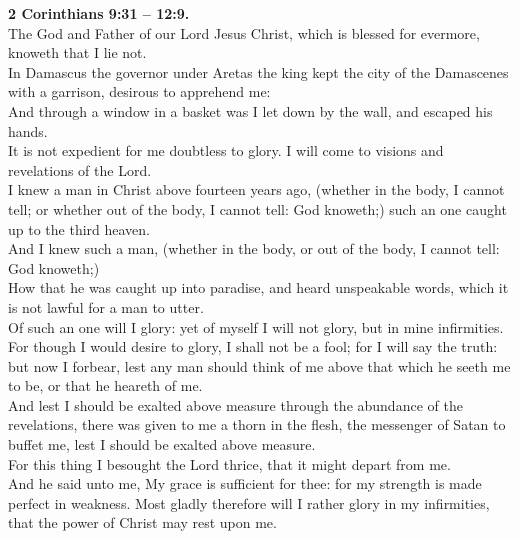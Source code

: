 \documentclass[10pt]{article} %
\begin{document}
{\begin{minipage}[t]{0.45\textwidth}
\textbf{
2 Corinthians 9:31 -- 12:9.
}\\
The God and Father of our Lord Jesus Christ, which is blessed for evermore, knoweth that I lie not.\\
In Damascus the governor under Aretas the king kept the city of the Damascenes with a garrison, desirous to apprehend me:\\
And through a window in a basket was I let down by the wall, and escaped his hands.\\
It is not expedient for me doubtless to glory. I will come to visions and revelations of the Lord.\\
I knew a man in Christ above fourteen years ago, (whether in the body, I cannot tell; or whether out of the body, I cannot tell: God knoweth;) such an one caught up to the third heaven.\\
And I knew such a man, (whether in the body, or out of the body, I cannot tell: God knoweth;)\\
How that he was caught up into paradise, and heard unspeakable words, which it is not lawful for a man to utter.\\
Of such an one will I glory: yet of myself I will not glory, but in mine infirmities.\\
For though I would desire to glory, I shall not be a fool; for I will say the truth: but now I forbear, lest any man should think of me above that which he seeth me to be, or that he heareth of me.\\
And lest I should be exalted above measure through the abundance of the revelations, there was given to me a thorn in the flesh, the messenger of Satan to buffet me, lest I should be exalted above measure.\\
For this thing I besought the Lord thrice, that it might depart from me.\\
And he said unto me, My grace is sufficient for thee: for my strength is made perfect in weakness. Most gladly therefore will I rather glory in my infirmities, that the power of Christ may rest upon me.\\
\end{minipage}}
\newpage\huge
\singlespacing
\end{document}
